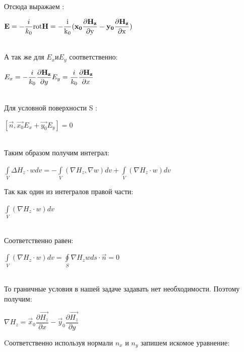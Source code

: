 Отсюда выражаем  : \\
\begin{center}
	$\vec{E} = - \dfrac{i}{k_{0}} \rm rot\vec{H} = - \dfrac{i}{k_{0}}(\vec{x_{0}}\dfrac{\partial \vec{H_{z}}}{\partial y} - \vec{y_{0}}\dfrac{\partial \vec{H_{z}}}{\partial x}) 
	$
\end{center}\\
А так же для $ E_{x} и E_{y} $ соответственно: \\
\begin{center}
	$ E_{x} = - 
	\dfrac{i}{k_{0}}
	\dfrac{\partial\vec{H_{z}}}{\partial y} \\
	E_{y} = \dfrac{i}{k_{0}}
	\dfrac{\partial\vec{H_{z}}}{\partial x} \\ $
\end{center} \\
Для условной поверхности S : \\
\begin{center}
	$ [\vec{n}, \vec{x_{0}}E_{x} + \vec{y_{0}}E_{y}] = 0 $
\end{center}\\
Таким образом получим интеграл:
\\
\begin{center}
	$ \int\limits_{V}^{} \Delta H_{z} \cdot wdv = - \int\limits_{V}^{}(\nabla H_{z}, \nabla w)dv +  \int\limits_{V}^{}(\nabla H_{z} \cdot w)dv
	$ \\
\end{center}
Так как один из интегралов правой части: 
\begin{center}
	$  \int\limits_{V}^{}(\nabla H_{z} \cdot w)dv $
\end{center} \\
Соответственно равен: 
\\
\begin{center}
	$\int\limits_{V}^{}(\nabla H_{z} \cdot w)dv = \oint\limits_{S}^{} \nabla H_{z}  wds \cdot \vec{n} = 0 $ \\
\end{center}
\\
То граничные условия в нашей задаче задавать нет необходимости.
Поэтому получим: \\
\begin{center}
	$ \nabla H_{z} = \vec{x}_{0} \dfrac{\partial\vec{H_{z}}}{\partial x} - \vec{y}_{0}
	\dfrac{\partial\vec{H_{z}}}{\partial y} $
	\\
\end{center}
Cоответственно используя нормали $n_{x}$ и $n_{y}$  запишем искомое уравнение:
